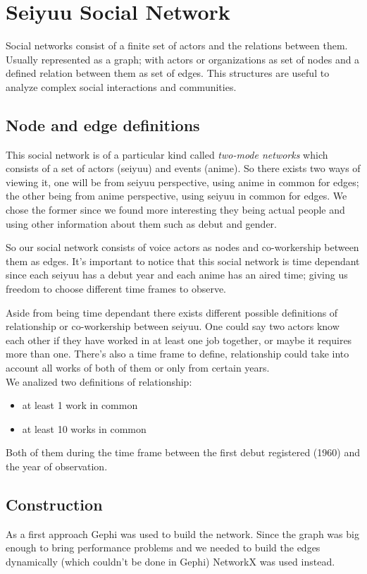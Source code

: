 \chapter{Seiyuu Social Network}
Social networks consist of a finite set of actors and the relations between them. Usually represented as a graph; with actors or organizations as set of nodes and a defined relation between them as set of edges. This structures are useful to analyze complex social interactions and communities.

\section{Node and edge definitions}
This social network is of a particular kind called \textit{two-mode networks} which consists of a set of actors (seiyuu) and events (anime). So there exists two ways of viewing it, one will be from seiyuu perspective, using anime in common for edges; the other being from anime perspective, using seiyuu in common for edges. We chose the former since we found more interesting they being actual people and using other information about them such as debut and gender.

So our social network consists of voice actors as nodes and co-workership between them as edges. It's important to notice that this social network is time dependant since each seiyuu has a debut year and each anime has an aired time; giving us freedom to choose different time frames to observe.

Aside from being time dependant there exists different possible definitions of relationship or co-workership between seiyuu. One could say two actors know each other if they have worked in at least one job together, or maybe it requires more than one. There's also a time frame to define, relationship could take into account all works of both of them or only from certain years.\\

We analized two definitions of relationship:
\begin{itemize}
\item at least 1 work in common
\item at least 10 works in common
\end{itemize}
Both of them during the time frame between the first debut registered (1960) and the year of observation.

\section{Construction}
As a first approach Gephi was used to build the network. Since the graph was big enough to bring performance problems and we needed to build the edges dynamically (which couldn't be done in Gephi) NetworkX was used instead.

